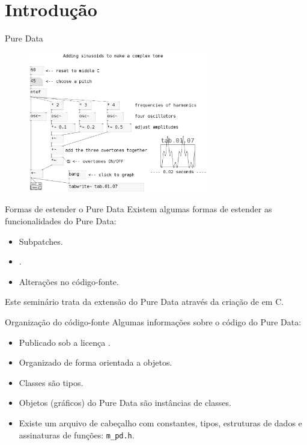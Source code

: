 \section{Introdução}

\begin{frame}{Pure Data}
\begin{figure}
\centering
\includegraphics[width=0.7\textwidth]{../images/pd-facil}
\end{figure}
\end{frame}


\begin{frame}{Formas de estender o Pure Data}
Existem algumas formas de estender as funcionalidades do Pure Data:
\begin{itemize}
\item Subpatches.
\item {}.
\item Alterações no código-fonte.
\end{itemize}
\pause
\vspace{1em}
Este seminário trata da extensão do Pure Data através da criação de
\externals em C.
\end{frame}


\begin{frame}[fragile]{Organização do código-fonte}
Algumas informações sobre o código do Pure Data:
\begin{itemize}
\item Publicado sob a licença .
\item Organizado de forma orientada a objetos.
\item Classes são tipos.
\item Objetos (gráficos) do Pure Data são instâncias de classes.
\item Existe um arquivo de cabeçalho com constantes, tipos, estruturas de
dados e assinaturas de funções: \texttt{m\_pd.h}.
\end{itemize}
\end{frame}


